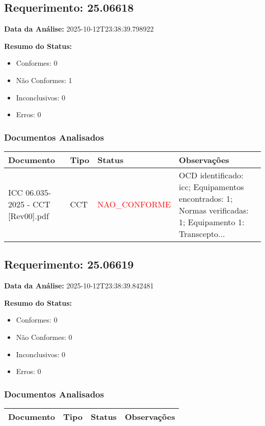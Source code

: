 \documentclass[12pt,a4paper]{article}
\begin{document}
\subsection{Requerimento: 25.06618}

\textbf{Data da Análise:} 2025-10-12T23:38:39.798922

\textbf{Resumo do Status:}
\begin{itemize}
    \item Conformes: 0
    \item Não Conformes: 1
    \item Inconclusivos: 0
    \item Erros: 0
\end{itemize}

\subsubsection{Documentos Analisados}

\begin{longtable}{|p{4cm}|p{2cm}|p{2cm}|p{6cm}|}
\hline
\textbf{Documento} & \textbf{Tipo} & \textbf{Status} & \textbf{Observações} \\
\hline
\endhead
ICC 06.035-2025 - CCT [Rev00].pdf & CCT & \textcolor{red}{NAO\_CONFORME} & OCD identificado: icc; Equipamentos encontrados: 1; Normas verificadas: 1; Equipamento 1: Transcepto... \\
\hline
\end{longtable}


\subsection{Requerimento: 25.06619}

\textbf{Data da Análise:} 2025-10-12T23:38:39.842481

\textbf{Resumo do Status:}
\begin{itemize}
    \item Conformes: 0
    \item Não Conformes: 0
    \item Inconclusivos: 0
    \item Erros: 0
\end{itemize}

\subsubsection{Documentos Analisados}

\begin{longtable}{|p{4cm}|p{2cm}|p{2cm}|p{6cm}|}
\hline
\textbf{Documento} & \textbf{Tipo} & \textbf{Status} & \textbf{Observações} \\
\hline
\endhead
\end{longtable}
\end{document}

